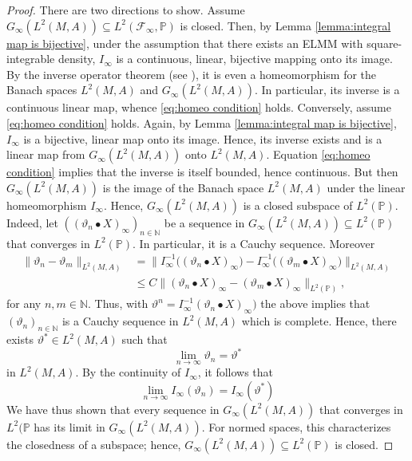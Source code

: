 \documentclass[11pt,a4paper,twoside,openany]{report}
\numberwithin{equation}{section}
\theoremstyle{plain} %
\theoremstyle{definition} %
\theoremstyle{remark} %
\let\parencite\authnumparencite
\begin{document}
\begin{proof}
    There are two directions to show. Assume  \(G_{\infty}(L^2(M,A))\subseteq 
L^2(\mathcal{F}_{\infty},\mathbb{P})\) is closed. Then, by Lemma \ref{lemma:integral map is bijective}, under the assumption that there exists an ELMM with square-integrable density, \(I_{\infty}\) is a continuous, linear, bijective mapping onto its image. By the inverse operator theorem (see \parencite[Cor.3.2,Ch.4]{SteinShakarchi2005RealAnalysis}), it is even a homeomorphism for the Banach spaces \(L^2(M,A)\) and \(G_{\infty}(L^2(M,A))\). In particular, its inverse is a continuous linear map, whence \eqref{eq:homeo condition} holds. Conversely, assume \eqref{eq:homeo condition} holds. Again, by Lemma \ref{lemma:integral map is bijective}, \(I_{\infty}\) is a bijective, linear map onto its image. Hence, its inverse exists and is a linear map from \(G_{\infty}(L^2(M,A))\) onto \(L^2(M,A)\). Equation \eqref{eq:homeo condition} implies that the inverse is itself bounded, hence continuous. But then \(G_{\infty}(L^2(M,A))\) is the image of the Banach space \(L^2(M,A)\) under the linear homeomorphism \(I_{\infty}\). Hence, \(G_{\infty}(L^2(M,A))\) is a closed subspace of \(L^2(\mathbb{P})\). Indeed, let \(((\vartheta_n\bullet X)_{\infty})_{n\in\mathbb{N}}\) be a sequence in \(G_{\infty}(L^2(M,A))\subseteq L^2(\mathbb{P})\) that converges in \(L^2(\mathbb{P})\). In particular, it is a Cauchy sequence. Moreover
   \begin{align*}
       \lVert \vartheta_n-\vartheta_m\rVert_{L^2(M,A)}&=\lVert I_{\infty}^{-1}\big((\vartheta_n\bullet X)_{\infty}\big)-I_{\infty}^{-1}\big((\vartheta_m\bullet X)_{\infty}\big)\rVert_{L^2(M,A)}\\&\leq C\lVert (\vartheta_n\bullet X)_{\infty}-(\vartheta_m\bullet X)_{\infty}\rVert_{L^2(\mathbb{P})},
   \end{align*}
   for any \(n,m\in\mathbb{N}\).
   Thus, with \(\vartheta^n=I_{\infty}^{-1}(\vartheta_n\bullet X)_{\infty})\) the above implies that  \((\vartheta_n)_{n\in\mathbb{N}}\) is a Cauchy sequence in \(L^2(M,A)\) which is complete. Hence, there exists \(\vartheta^*\in L^2(M,A)\) such that 
   \begin{equation*}
       \lim_{n\to\infty}\vartheta_n=\vartheta^*
   \end{equation*}
   in \(L^2(M,A)\).
 By the continuity of \(I_{\infty}\), it follows that 
   \begin{equation*}
       \lim_{n\to\infty}I_{\infty}(\vartheta
       _n)=I_{\infty}(\vartheta^*)
   \end{equation*}
   We have thus shown that every sequence in \(G_{\infty}(L^2(M,A))\) that converges in \(L^2(\mathbb{P}\) has its limit in \(G_{\infty}(L^2(M,A))\). For normed spaces, this characterizes the closedness of a subspace; hence, \(G_{\infty}(L^2(M,A))\subseteq L^2(\mathbb{P})\) is closed. 
\end{proof}
\end{document}
